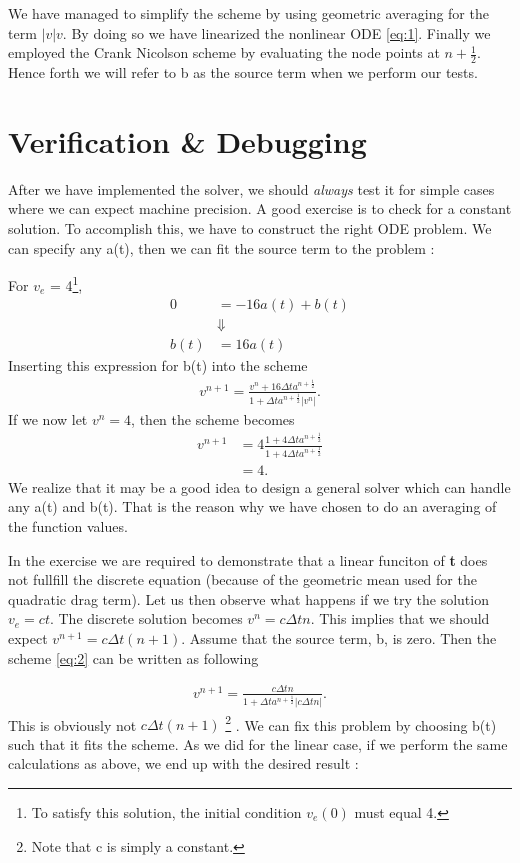 \documentclass[11pt]{article} %
\begin{document}
We have managed to simplify the scheme by using geometric averaging for the term $|v|v$. By 
doing so we have linearized the nonlinear ODE \eqref{eq:1}. Finally we employed the Crank 
Nicolson scheme by evaluating the node points at $n+\frac{1}{2}$. Hence forth we will refer to b as 
the source term when we perform our tests.

\section{Verification \& Debugging}
After we have implemented the solver, we should \emph{always} test it for simple cases where 
we can expect machine precision. A good exercise is to check for a constant solution. To accomplish 
this, we have to construct the right ODE problem. We can specify any a(t), then we can fit the source 
term to the problem :

For $v_e$ = 4\footnote{To satisfy this solution, the initial condition $v_e(0)$ must equal 4.},
\begin{align*}
0 &= -16a(t) + b(t) \\
&\Downarrow \\
b(t) &= 16a(t)
\end{align*}
Inserting this expression for b(t) into the scheme
\begin{align*}
v^{n+1} = \frac{v^n + 16\Delta t a^{n+\frac{1}{2}}}{1 + \Delta t a^{n+\frac{1}{2}}|v^n|}.
\end{align*}
If we now let $v^n = 4$, then the scheme becomes
\begin{align*}
v^{n+1} &= 4\frac{1 + 4\Delta t a^{n+\frac{1}{2}}}{1 + 4\Delta t a^{n+\frac{1}{2}}} \\
             &= 4.
\end{align*}
We realize that it may be a good idea to design a general solver which can handle any a(t) and b(t). 
That is the reason why we have chosen to do an averaging of the function values. 

In the exercise we are required to demonstrate that a linear funciton of \textbf{t} does not fullfill 
the discrete equation (because of the geometric mean used for the quadratic drag term). Let us
then observe what happens  if we try the solution $v_e = ct$. The discrete solution becomes $v^n 
= c\Delta t n$. This implies that we should expect $v^{n+1} = c\Delta t (n+1)$. Assume that the 
source term, b, is zero. Then the scheme \eqref{eq:2} can be written as following

\begin{align*}
v^{n+1} = \frac{c\Delta t n}{1 + \Delta t a^{n+\frac{1}{2}}|c\Delta t n|}.
\end{align*}
This is obviously not $c\Delta t (n+1)$ \footnote[1]{Note that c is simply a constant.} . We can fix this 
problem by choosing b(t) such that it fits the scheme. As we did for the linear case, if we 
perform the same calculations as above, we end up with the desired result :
\end{document}
